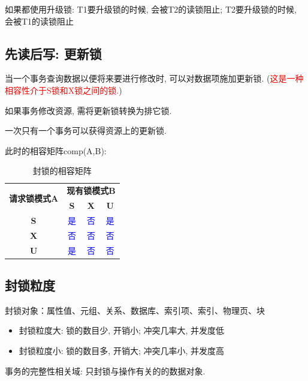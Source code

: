 如果都使用升级锁: T1要升级锁的时候, 会被T2的读锁阻止; T2要升级锁的时候, 会被T1的读锁阻止


\subsection{先读后写: 更新锁}

\begin{definition}
  当一个事务查询数据以便将来要进行修改时, 可以对数据项施加更新锁. (\textcolor{red}{这是一种相容性介于S锁和X锁之间的锁.})

  如果事务修改资源, 需将更新锁转换为排它锁.

  一次只有一个事务可以获得资源上的更新锁.
\end{definition}

此时的相容矩阵comp(A,B):
\begin{table}[H]
    \centering
    \begin{tabular}{|c|c|c|c|}
        \hline
        \multirow{2}{*}{\textbf{请求锁模式A}} & \multicolumn{3}{c|}{\textbf{现有锁模式B}} \\ \cline{2-4}
         & \textbf{S} & \textbf{X} & \textbf{U} \\ \hline
        \textbf{S} & \textcolor{blue}{是} & \textcolor{blue}{否} & \textcolor{blue}{是} \\ \hline
        \textbf{X} & \textcolor{blue}{否} & \textcolor{blue}{否} & \textcolor{blue}{否} \\ \hline
        \textbf{U} & \cellcolor{red!10}\textcolor{blue}{是} & \textcolor{blue}{否} & \cellcolor{red!10}\textcolor{blue}{否} \\ \hline
    \end{tabular}
    \caption{封锁的相容矩阵}
\end{table}

\subsection{封锁粒度}

封锁对象：属性值、元组、关系、数据库、索引项、索引、物理页、块

\begin{itemize}
  \item 封锁粒度大: 锁的数目少, 开销小; 冲突几率大, 并发度低
  \item 封锁粒度小: 锁的数目多, 开销大; 冲突几率小, 并发度高
\end{itemize}

\begin{definition}[事务的完整性相关域]
  事务的完整性相关域: 只封锁与操作有关的的数据对象.
\end{definition}

